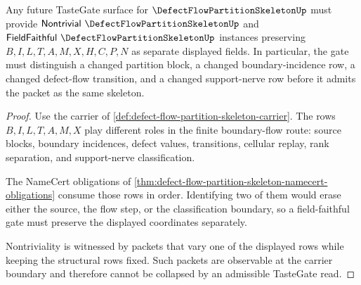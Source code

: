 \begin{theorem}
\label{thm:defect-flow-partition-skeleton-tastegate-boundary}
Any future TasteGate surface for $\DefectFlowPartitionSkeletonUp$ must provide $\mathsf{Nontrivial}\ \DefectFlowPartitionSkeletonUp$ and $\mathsf{FieldFaithful}\ \DefectFlowPartitionSkeletonUp$ instances preserving $B,I,L,T,A,M,X,H,C,P,N$ as separate displayed fields. In particular, the gate must distinguish a changed partition block, a changed boundary-incidence row, a changed defect-flow transition, and a changed support-nerve row before it admits the packet as the same skeleton.
\end{theorem}
\begin{proof}
Use the carrier of \autoref{def:defect-flow-partition-skeleton-carrier}. The rows $B,I,L,T,A,M,X$ play different roles in the finite boundary-flow route: source blocks, boundary incidences, defect values, transitions, cellular replay, rank separation, and support-nerve classification.

The NameCert obligations of \autoref{thm:defect-flow-partition-skeleton-namecert-obligations} consume those rows in order. Identifying two of them would erase either the source, the flow step, or the classification boundary, so a field-faithful gate must preserve the displayed coordinates separately.

Nontriviality is witnessed by packets that vary one of the displayed rows while keeping the structural rows fixed. Such packets are observable at the carrier boundary and therefore cannot be collapsed by an admissible TasteGate read.
\end{proof}



